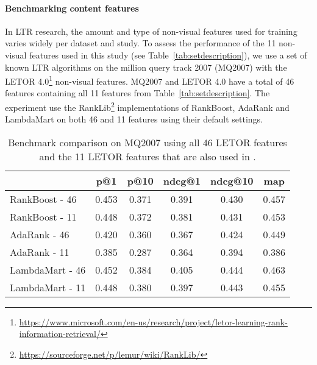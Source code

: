 
\paragraph{Benchmarking content features}



In \ac{LTR} research, the amount and type of non-visual features used for training varies widely per dataset and study.
To assess the performance of the 11 non-visual features used in this study (see Table~\ref{tab:setdescription}), we use a set of known LTR algorithms on the million query track 2007 (MQ2007)\cite{allan2007million} with the LETOR 4.0\footnote{\url{https://www.microsoft.com/en-us/research/project/letor-learning-rank-information-retrieval/}} non-visual features.
MQ2007 and LETOR 4.0 have a total of 46 features containing all 11 features from Table~\ref{tab:setdescription}.
The experiment use the RankLib\footnote{\url{https://sourceforge.net/p/lemur/wiki/RankLib/}} implementations of RankBoost, AdaRank and LambdaMart on both 46 and 11 features using their default settings. 

\begin{table}[h]
\caption{Benchmark comparison on MQ2007 using all 46 LETOR features and the 11 LETOR features that are also used in \datasetname.}
\label{tab:11vs46}
\centering
\begin{tabular}{lccccc}
\toprule
           & p@1  & p@10   & ndcg@1 & ndcg@10 & map \\ 
\midrule
RankBoost - 46 & 0.453 & 0.371 & 0.391 & 0.430  & 0.457 \\
RankBoost - 11 & 0.448 & 0.372 & 0.381  & 0.431   & 0.453 \\
\midrule
AdaRank - 46  & 0.420 & 0.360 & 0.367 & 0.424  & 0.449 \\
AdaRank - 11  & 0.385 & 0.287 & 0.364  & 0.394   & 0.386 \\ 
\midrule
LambdaMart - 46 & 0.452 & 0.384 & 0.405 & 0.444  & 0.463 \\
LambdaMart - 11 & 0.448 & 0.380 & 0.397  & 0.443   & 0.455 \\
\bottomrule
\end{tabular}
\end{table}

